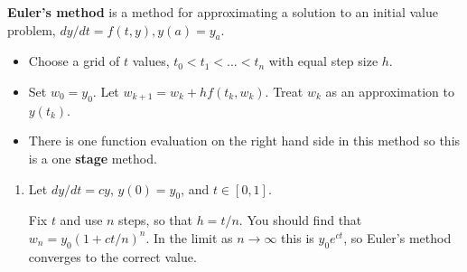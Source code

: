 \documentclass[12pt,letterpaper,noanswers]{exam}
\begin{document}
\begin{tcolorbox}
\textbf{Euler's method} is a method for approximating a solution to an initial value problem, $dy/dt = f(t,y), y(a) = y_a$.
\begin{itemize}
\itemsep0pt
    \item Choose a grid of $t$ values, $t_0 < t_1 < ... < t_n$ with equal step size $h$.
    \item Set $w_0 = y_0$.  Let $w_{k+1} = w_k + hf(t_k,w_k)$.  Treat $w_k$ as an approximation to $y(t_k)$.
    \item There is one function evaluation on the right hand side in this method so this is a one \textbf{stage} method.
\end{itemize}
\end{tcolorbox}
\begin{enumerate}[resume=classQ]
\item Let $dy/dt = cy$, $y(0) = y_0$, and $t\in[0,1]$.
Fix $t$ and use $n$ steps, so that $h = t/n$.  You should find that $w_n = y_0(1+ct/n)^n$.  In the limit as $n\rightarrow\infty$ this is $y_0e^{ct}$, so Euler's method converges to the correct value.
\end{enumerate}
\end{document}
